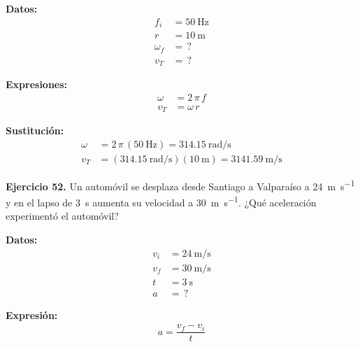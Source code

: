 \documentclass[14pt]{extarticle}
\begin{document}
\vspace*{0.3cm}
\begin{minipage}[t]{0.4\linewidth}
\textbf{Datos:}
\begin{align*}
f_{i} &= \SI{50}{\hertz} \\
r &= \SI{10}{\meter} \\
\omega_{f} &= \, ? \\
v_{T} &= \, ?
\end{align*}
\end{minipage}
\begin{minipage}[t]{0.4\linewidth}
\textbf{Expresiones:}
\begin{align*}
\omega &= 2 \, \pi \, f \\
v_{T} &= \omega \, r
\end{align*}
\end{minipage}

\vspace{0.3cm}
\textbf{Sustitución:}
\begin{align*}
\omega &= 2 \, \pi \, \left( \SI{50}{\hertz} \right) = \SI[per-mode=fraction]{314.15}{\radian\per\second} \\[0.5em]
v_{T} &= \left( \SI[per-mode=fraction]{314.15}{\radian\per\second} \right) \left( \SI{10}{\meter} \right) = \SI[per-mode=fraction]{3141.59}{\meter\per\second}
\end{align*}

\vspace*{0.3cm}
\textbf{Ejercicio 52. } Un automóvil se desplaza desde Santiago a Valparaíso a \SI{24}{\meter\per\second} y en el lapso de \SI{3}{\second} aumenta su velocidad a \SI{30}{\meter\per\second}. ¿Qué aceleración experimentó el automóvil?

\vspace*{0.3cm}
\begin{minipage}[t]{0.4\linewidth}
\textbf{Datos:}
\begin{align*}
v_{i} &= \SI{24}{\meter\per\second} \\
v_{f} &= \SI{30}{\meter\per\second} \\
t &= \SI{3}{\second} \\
a &= \, ?
\end{align*}
\end{minipage}
\begin{minipage}[t]{0.4\linewidth}
\textbf{Expresión:}
\begin{align*}
a = \dfrac{v_{f} - v_{i}}{t}
\end{align*}
\end{minipage}
\end{document}
